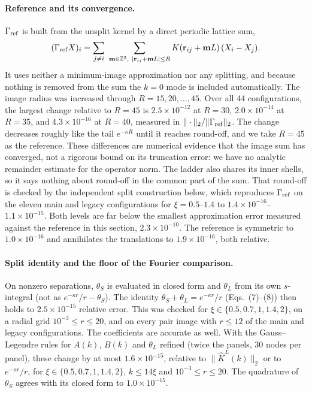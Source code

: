 \paragraph{Reference and its convergence.}
$\Gamma_{\rm ref}$ is built from the unsplit kernel by a direct periodic lattice sum,
\[
(\Gamma_{\rm ref}X)_i=\sum_{j\ne i}\ \sum_{\mathbf m\in\mathbb Z^3,\ |\mathbf r_{ij}+\mathbf mL|\le R}
K(\mathbf r_{ij}+\mathbf mL)\,(X_i-X_j).
\]
It uses neither a minimum-image approximation nor any splitting, and because nothing is removed from the sum the
$k=0$ mode is included automatically. The image radius was increased through
$R=15,20,\dots,45$. Over all 44 configurations, the largest change relative to $R=45$ is $2.5\times10^{-12}$ at
$R=30$, $2.0\times10^{-14}$ at $R=35$, and $4.3\times10^{-16}$ at $R=40$, measured in $\|\cdot\|_2/\|\Gamma_{\rm ref}\|_2$.
The change decreases roughly like the tail $e^{-\kappa R}$ until it reaches round-off, and we take $R=45$ as the
reference. These differences are numerical evidence that the image sum has converged, not a rigorous bound on its
truncation error: we have no analytic remainder estimate for the operator norm. The ladder also shares its inner
shells, so it says nothing about round-off in the common part of the sum. That round-off is checked by the independent
split construction below, which reproduces $\Gamma_{\rm ref}$ on the eleven main and legacy configurations for
$\xi=0.5$--$1.4$ to $1.4\times10^{-16}$--$1.1\times10^{-15}$. Both levels are far below the smallest
approximation error measured against the reference in this section, $2.3\times10^{-10}$. The reference is symmetric to
$1.0\times10^{-16}$ and annihilates the translations to $1.9\times10^{-16}$, both relative.

\paragraph{Split identity and the floor of the Fourier comparison.}
On nonzero separations, $\theta_S$ is evaluated in closed form and $\theta_L$ from its own $s$-integral (not as
$e^{-\kappa r}/r-\theta_S$). The identity $\theta_S+\theta_L=e^{-\kappa r}/r$ (Eqs.~(7)--(8)) then holds to
$2.5\times10^{-15}$ relative error. This was checked for $\xi\in\{0.5,0.7,1,1.4,2\}$, on a radial grid
$10^{-3}\le r\le20$, and on every pair image with $r\le12$ of the main and legacy configurations. The coefficients are
accurate as well. With the Gauss--Legendre rules for $A(k)$, $B(k)$ and $\theta_L$ refined (twice the panels, 30 nodes
per panel), these change by at most $1.6\times10^{-15}$, relative to $\|\hat K^L(k)\|_2$ or to $e^{-\kappa r}/r$, for
$\xi\in\{0.5,0.7,1,1.4,2\}$, $k\le14\xi$ and $10^{-3}\le r\le20$. The quadrature of $\theta_S$ agrees with its closed form to
$1.0\times10^{-15}$.

